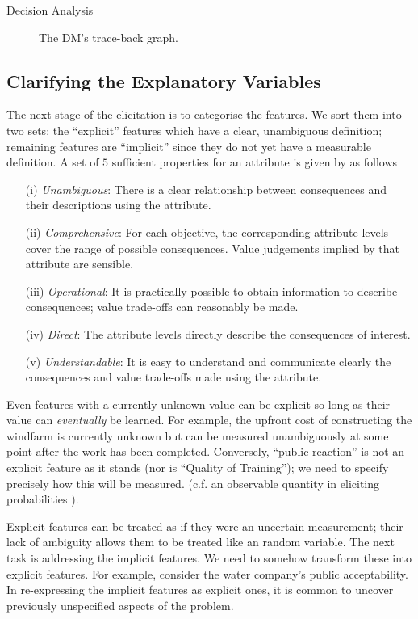 \begin{chapter}{Decision Analysis \label{Ch:decision}}
\begin{figure}
	\caption{The DM's trace-back graph.}

	\label{Fig:traceback}
\end{figure}

\subsection{Clarifying the Explanatory Variables}

The next stage of the elicitation is to categorise the features. We sort them into two sets: the ``explicit'' features which have a clear, unambiguous definition; remaining features are ``implicit'' since they do not yet have a measurable definition. A set of $5$ sufficient properties for an attribute is given by \citet{Keeney2005} as follows

\begin{enumerate}
\item[(i)] \textit{Unambiguous}: There is a clear relationship between consequences and their descriptions using the attribute.
\item[(ii)] \textit{Comprehensive}: For each objective, the corresponding attribute levels cover the range of possible consequences. Value judgements implied by that attribute are sensible.
\item[(iii)] \textit{Operational}: It is practically possible to obtain information to describe consequences; value trade-offs can reasonably be made.
\item[(iv)] \textit{Direct}: The attribute levels directly describe the consequences of interest.
\item[(v)] \textit{Understandable}: It is easy to understand and communicate clearly the consequences and value trade-offs made using the attribute.
\end{enumerate}

Even features with a currently unknown value can be explicit so long as their value can \textit{eventually} be learned. For example, the upfront cost of constructing the windfarm is currently unknown but can be measured unambiguously at some point after the work has been completed. Conversely, ``public reaction'' is not an explicit feature as it stands (nor is ``Quality of Training''); we need to specify precisely how this will be measured. (c.f. an observable quantity in eliciting probabilities \citep{Ohagan06}).

Explicit features can be treated as if they were an uncertain measurement; their lack of ambiguity allows them to be treated like an random variable. The next task is addressing the implicit features. We need to somehow transform these into explicit features. For example, consider the water company's public acceptability. In re-expressing the implicit features as explicit ones, it is common to uncover previously unspecified aspects of the problem.


\end{chapter}
